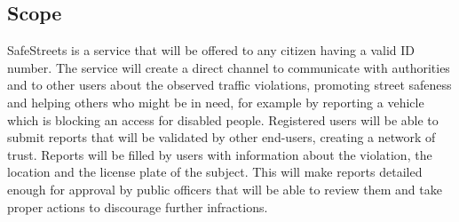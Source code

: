 \subsection{Scope}
SafeStreets is a service that will be offered to any citizen having a valid ID number.
The service will create a direct channel to communicate with authorities and to other users about the observed traffic violations, promoting street safeness and
helping others who might be in need, for example by reporting a vehicle which is blocking an access for disabled people.
Registered users will be able to submit reports that will be validated by other end-users, creating a network of trust.
Reports will be filled by users with information about the violation, the location and the license plate of the subject. This will make reports detailed enough for
approval by public officers that will be able to review them and take proper actions to discourage further infractions.
